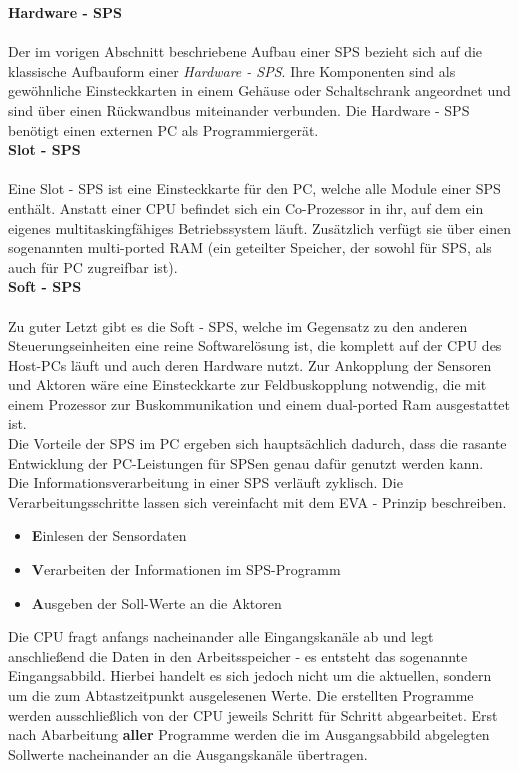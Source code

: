 	\textbf{Hardware - SPS}\\\\
	Der im vorigen Abschnitt beschriebene Aufbau einer SPS bezieht sich auf die klassische Aufbauform einer \textit{Hardware - SPS}. Ihre Komponenten sind als gewöhnliche Einsteckkarten in einem Gehäuse oder Schaltschrank angeordnet und sind über einen Rückwandbus miteinander verbunden. Die Hardware - SPS benötigt einen externen PC als Programmiergerät.\\
	
	\textbf{Slot - SPS}\\\\
	Eine Slot - SPS ist eine Einsteckkarte für den PC, welche alle Module einer SPS enthält. Anstatt einer CPU befindet sich ein Co-Prozessor in ihr, auf dem ein eigenes multitaskingfähiges Betriebssystem läuft. Zusätzlich verfügt sie über einen sogenannten multi-ported RAM (ein geteilter Speicher, der sowohl für SPS, als auch für PC zugreifbar ist).\\
	
	\textbf{Soft - SPS}\\\\
	Zu guter Letzt gibt es die Soft - SPS, welche im Gegensatz zu den anderen Steuerungseinheiten eine reine Softwarelösung ist, die komplett auf der CPU des Host-PCs läuft und auch deren Hardware nutzt. Zur Ankopplung der Sensoren und Aktoren wäre eine Einsteckkarte zur Feldbuskopplung notwendig, die mit einem Prozessor zur Buskommunikation und einem dual-ported Ram ausgestattet ist.\\
	
	Die Vorteile der SPS im PC ergeben sich hauptsächlich dadurch, dass die rasante Entwicklung der PC-Leistungen für SPSen genau dafür genutzt werden kann.\\
	
	Die Informationsverarbeitung in einer SPS verläuft zyklisch. Die Verarbeitungsschritte lassen sich vereinfacht mit dem EVA - Prinzip beschreiben.
	
	\begin{itemize}
		\item \textbf{E}inlesen der Sensordaten
		\item \textbf{V}erarbeiten der Informationen im SPS-Programm
		\item \textbf{A}usgeben der Soll-Werte an die Aktoren
	\end{itemize}
	
	Die CPU fragt anfangs nacheinander alle Eingangskanäle ab und legt anschließend die Daten in den Arbeitsspeicher - es entsteht das sogenannte \glqq Eingangsabbild\grqq. Hierbei handelt es sich jedoch nicht um die aktuellen, sondern um die zum Abtastzeitpunkt ausgelesenen Werte. Die erstellten Programme werden ausschließlich von der CPU jeweils Schritt für Schritt abgearbeitet. Erst nach Abarbeitung \textbf{aller} Programme werden die im Ausgangsabbild abgelegten Sollwerte nacheinander an die Ausgangskanäle übertragen. \cite{mseitz_sps} \\ 
	
